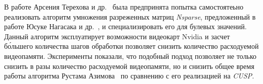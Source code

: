 В работе Арсения Терехова и др.~\cite{inproceedings:cfqp_matrix_with_single_source} была предпринята попытка самостоятеьно реализовать алгоритм умножения разреженных матриц \textit{Nsparse}, предложенный в работе Юсуке Нагасака и др.~\cite{inproceedings:spgemm_mem_saving_for_nvidia}, и специализировать его для булевых значений. Данный алгоритм эксплуатирует возможности видеокарт Nvidia и засчет б\'ольшего количества шагов обработки позволяет снизить количество расходуемой видеопамяти. Эксперименты показали, что подобный подход позволяет не только снизить в разы количество расходуемой видеопамяти, но и снизить общее время работы алгоритма Рустама Азимова~\cite{inproceedings:matrix_cfpq} по сравнению с его реализацией на \textit{CUSP}. 

